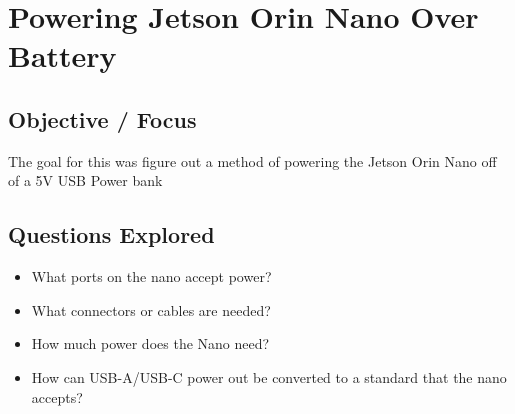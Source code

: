 \section{Powering Jetson Orin Nano Over Battery}

\subsection{Objective / Focus}
The goal for this was figure out a method of powering the Jetson Orin Nano off of a 5V USB Power bank

\subsection{Questions Explored}
\begin{itemize}
    \item What ports on the nano accept power?
    \item What connectors or cables are needed?
    \item How much power does the Nano need?
    \item How can USB-A/USB-C power out be converted to a standard that the nano accepts?
\end{itemize}

